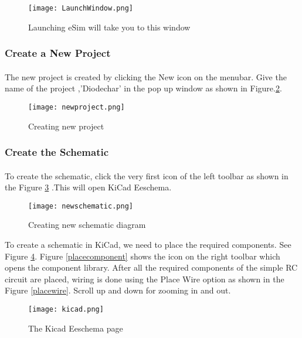 \begin{figure}[H]
\centering
\texttt{[image: LaunchWindow.png]}
\caption{Launching eSim will take you to this window}
\label{LaunchWindow}
\end{figure}

\subsubsection{Create a New Project}

\paragraph{ } The new project is created by clicking the New icon on the
menubar. Give the name of the project ,'Diodechar' in the pop up window as shown in Figure.\ref{newproject}. 
\begin{figure}[H]
\centering
\texttt{[image: newproject.png]}
\caption{Creating new project}
\label{newproject}
\end{figure}

\subsubsection{Create the Schematic}

\paragraph{}  To create the schematic, click the very first icon of the
left toolbar as shown in the Figure \ref{newschematic} .This will open KiCad Eeschema.


\begin{figure}[H]
\centering
\texttt{[image: newschematic.png]}
\caption{Creating new schematic diagram}
\label{newschematic}
\end{figure}

To create a schematic in KiCad, we need to place the required components. See Figure \ref{kicad}.  Figure \ref{placecomponent}
shows the icon on the right toolbar which opens the component library. After all the required components of the simple RC circuit are placed, wiring is
done using the Place Wire option as shown in the Figure \ref{placewire}. Scroll up and down for zooming in and out.

\begin{figure}[H]
\centering
\texttt{[image: kicad.png]}
\caption{The Kicad Eeschema page}
\label{kicad}
\end{figure}




